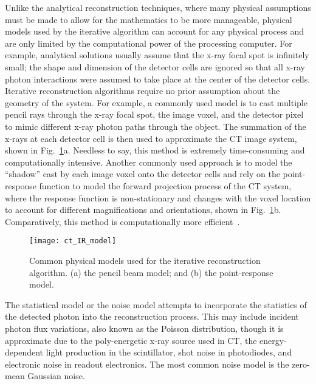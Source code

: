Unlike the analytical reconstruction techniques, where many physical assumptions must be made to allow for the mathematics to be more manageable, physical models used by the iterative algorithm can account for any physical process and are only limited by the computational power of the processing computer.  For example, analytical solutions usually assume that the x-ray focal spot is infinitely small; the shape and dimension of the detector cells are ignored so that all x-ray photon interactions were assumed to take place at the center of the detector cells.  Iterative reconstruction algorithms require no prior assumption about the geometry of the system.  For example, a commonly used model is to cast multiple pencil rays through the x-ray focal spot, the image voxel, and the detector pixel to mimic different x-ray photon paths through the object.  The summation of the x-rays at each detector cell is then used to approximate the CT image system, shown in Fig.~\ref{fig:physical_modeling}a. Needless to say, this method is extremely time-consuming and computationally intensive.  Another commonly used approach is to model the ``shadow'' cast by each image voxel onto the detector cells and rely on the point-response function to model the forward projection process of the CT system, where the response function is non-stationary and changes with the voxel location to account for different magnifications and orientations, shown in Fig.~\ref{fig:physical_modeling}b.  Comparatively, this method is computationally more efficient~\citep{Hsieh2013}.
%
\begin{figure}
\texttt{[image: ct\_IR\_model]}
\caption{Common physical models used for the iterative reconstruction algorithm. (a) the pencil beam model; and (b) the point-response model.}
\label{fig:physical_modeling}
\end{figure}

The statistical model or the noise model attempts to incorporate the statistics of the detected photon into the reconstruction process.  This may include incident photon flux variations, also known as the Poisson distribution, though it is approximate due to the poly-energetic x-ray source used in CT, the energy-dependent light production in the scintillator, shot noise in photodiodes, and electronic noise in readout electronics. The most common noise model is the zero-mean Gaussian noise.

